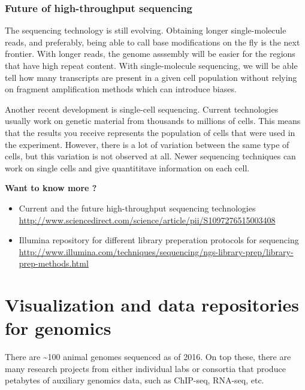 \documentclass[12pt,]{krantz}
\let\BeginKnitrBlock\begin \let\EndKnitrBlock\end
\begin{document}
\hypertarget{future-of-high-throughput-sequencing}{%
\subsubsection{Future of high-throughput sequencing}\label{future-of-high-throughput-sequencing}}

The sequencing technology is still evolving. Obtaining
longer single-molecule reads, and preferably, being able to call base modifications
on the fly is the next frontier.
With longer reads, the genome asssembly will be easier for the regions
that have high repeat content. With single-molecule sequencing, we will be able
tell how many transcripts are present in a given cell population without
relying on fragment amplification methods which can introduce biases.

Another recent development is single-cell sequencing. Current technologies usually
work on genetic material from thousands to millions of cells. This means that the
results you receive represents the population of cells that were used in the
experiment. However, there is a lot of variation between the same type of cells, but
this variation is not observed at all. Newer sequencing techniques can work
on single cells and give quantititave information on each cell.

\BeginKnitrBlock{rmdtip}
\textbf{Want to know more ?}

\begin{itemize}
\item
  Current and the future high-throughput sequencing technologies \url{http://www.sciencedirect.com/science/article/pii/S1097276515003408}
\item
  Illumina repository for different library preperation protocols for sequencing \url{http://www.illumina.com/techniques/sequencing/ngs-library-prep/library-prep-methods.html}
\end{itemize}
\EndKnitrBlock{rmdtip}

\hypertarget{visualization-and-data-repositories-for-genomics}{%
\section{Visualization and data repositories for genomics}\label{visualization-and-data-repositories-for-genomics}}

There are \textasciitilde{}100 animal genomes sequenced as of 2016. On top these, there are many
research projects from either individual labs or consortia that
produce petabytes of auxiliary genomics data, such as ChIP-seq, RNA-seq, etc.
\end{document}
